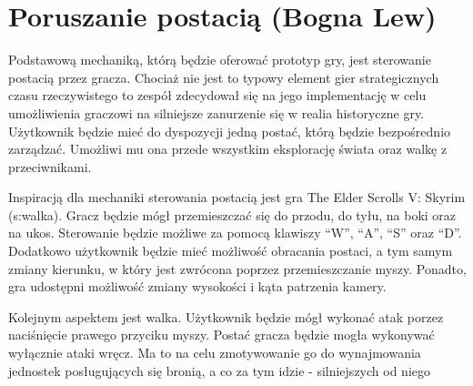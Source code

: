 \section{Poruszanie postacią (Bogna Lew)}
Podstawową mechaniką, którą będzie oferować prototyp gry, jest sterowanie postacią przez gracza. Chociaż nie jest
to typowy element gier strategicznych czasu rzeczywistego to zespół zdecydował się na jego implementację w celu umożliwienia
graczowi na silniejsze zanurzenie się w realia historyczne gry. Użytkownik będzie
mieć do dyspozycji jedną postać, którą będzie bezpośrednio zarządzać. Umożliwi mu ona przede wszystkim eksplorację
świata oraz walkę z przeciwnikami.

Inspiracją dla mechaniki sterowania postacią jest gra The Elder Scrolls V: Skyrim \por(s:walka). Gracz będzie mógł przemieszczać się
do przodu, do tyłu, na boki oraz na ukos. Sterowanie będzie możliwe za pomocą klawiszy  “W”, “A”, “S” oraz “D”.
Dodatkowo użytkownik będzie mieć możliwość obracania postaci, a tym samym zmiany kierunku, w który jest zwrócona poprzez
przemieszczanie myszy. Ponadto, gra udostępni możliwość zmiany wysokości i kąta patrzenia kamery.

Kolejnym aspektem jest walka. Użytkownik będzie mógł wykonać atak porzez naciśnięcie prawego przyciku myszy. Postać
gracza będzie mogła wykonywać wyłącznie ataki wręcz. Ma to na celu zmotywowanie go do wynajmowania jednostek posługujących
się bronią, a co za tym idzie - silniejszych od niego